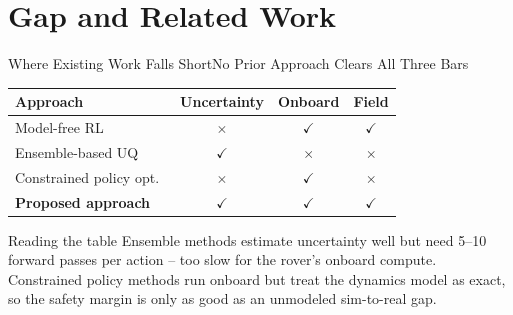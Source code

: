 \section{Gap and Related Work}

\begin{frame}{Where Existing Work Falls Short}{No Prior Approach Clears All Three Bars}
  \begin{table}
    \centering
    \small
    \begin{tabular}{lccc}
      \toprule
      \textbf{Approach} & \textbf{Uncertainty} & \textbf{Onboard} & \textbf{Field} \\
      \midrule
      Model-free RL \cite{nandakumar2022saferl} & $\times$ & $\checkmark$ & $\checkmark$ \\
      Ensemble-based UQ \cite{garcia2024evidential} & $\checkmark$ & $\times$ & $\times$ \\
      Constrained policy opt.\ \cite{osei2023constrained} & $\times$ & $\checkmark$ & $\times$ \\
      \midrule
      \rowcolor{copper!14}
      \textbf{Proposed approach} & $\checkmark$ & $\checkmark$ & $\checkmark$ \\
      \bottomrule
    \end{tabular}
  \end{table}
  \par\vspace{8pt}

  \begin{notebox}{Reading the table}
    \footnotesize
    Ensemble methods estimate uncertainty well but need 5--10 forward passes
    per action -- too slow for the rover's onboard compute. Constrained
    policy methods run onboard but treat the dynamics model as exact, so the
    safety margin is only as good as an unmodeled sim-to-real gap.
  \end{notebox}
\end{frame}

